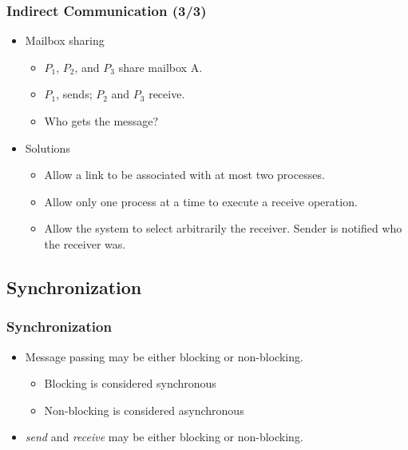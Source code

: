 \documentclass[CJKutf8,xcolor=pdftex,dvipsnames,table]{beamer}
\begin{document}
\begin{CJK*}{UTF8}{song}
  \begin{frame}
  \frametitle{Indirect Communication (3/3)} \pause
  \begin{itemize}
  \item{Mailbox sharing} \pause
    \begin{itemize}
    \item{$P_1$, $P_2$, and $P_3$ share mailbox A.} \pause
    \item{$P_1$, sends; $P_2$ and $P_3$ receive.} \pause
    \item{Who gets the message?} \pause
    \end{itemize}
  \item{Solutions} \pause
    \begin{itemize}
    \item{Allow a link to be associated with at most two processes.} \pause
    \item{Allow only one process at a time to execute a receive operation.} \pause
    \item{Allow the system to select arbitrarily the receiver.  Sender is notified who the receiver was.}
    \end{itemize}
  \end{itemize}
  \end{frame}

  \subsection{Synchronization}

  \begin{frame}
  \frametitle{Synchronization} \pause
  \begin{itemize}
  \item{Message passing may be either blocking or non-blocking.} \pause
    \begin{itemize}
    \item{Blocking is considered synchronous} \pause
    \item{Non-blocking is considered asynchronous} \pause
    \end{itemize}
  \item{\emph{send} and \emph{receive} may be either blocking or non-blocking.}
  \end{itemize}
  \end{frame}


\end{CJK*}
\end{document}
